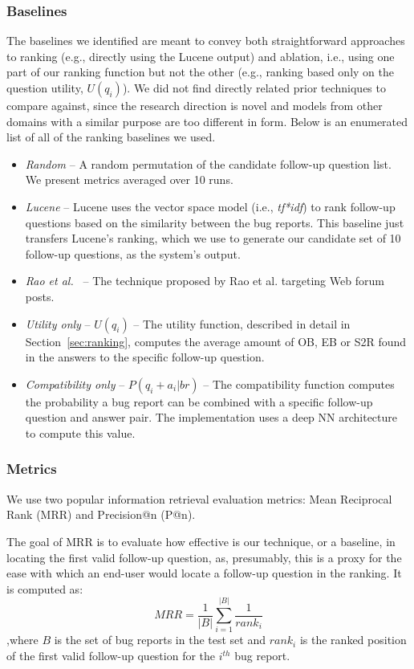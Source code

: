\subsubsection{Baselines}
The baselines we identified are meant to convey both straightforward approaches to ranking (e.g., directly using the Lucene output) and
ablation, i.e., using one part of our ranking function but not the other (e.g., ranking based only on the question utility, $U(q_{i})$).
We did not find directly related prior techniques to compare against, since the research direction is novel and models from other domains
with a similar purpose are too different in form. Below is an enumerated list of all of the ranking baselines we used.
\begin{itemize}
\item {\em Random} -- A random permutation of the candidate follow-up question list. We present metrics averaged over 10 runs.
\item {\em Lucene} -- Lucene uses the vector space model (i.e., {\em tf*idf}) to rank follow-up questions based on the similarity between the bug reports. This baseline just transfers Lucene's ranking, which we use to generate our candidate set of 10 follow-up questions, as the system's output.
\item {\em Rao et al.~\cite{rao-daume-iii-2018-learning}} -- The technique proposed by Rao et al. targeting Web forum posts.
\item {\em Utility only} -- $U(q_{i})$ -- The utility function, described in detail in Section~\ref{sec:ranking}, computes the average amount of OB, EB or S2R found in the answers to the specific follow-up question.
\item {\em Compatibility only} -- $P(q_{i}+a_{i}|br)$ -- The compatibility function computes the probability a bug report can be combined with a specific follow-up question and answer pair. The implementation uses a deep NN architecture to compute this value.
\end{itemize}

\subsubsection{Metrics}
We use two popular information retrieval evaluation metrics: Mean Reciprocal Rank (MRR) and Precision@n (P@n).

The goal of MRR is to evaluate how effective is our technique, or a baseline, in locating the first valid follow-up question, as, presumably, this is a proxy for the ease with which an end-user would locate a follow-up question in the ranking. It is
computed as: $$MRR = \frac{1}{|B|} \sum_{i=1}^{|B|} \frac{1}{rank_{i}}$$ ,where $B$ is the set of bug reports in the test set and $rank_{i}$ is the ranked position of the first valid follow-up question for the $i^{th}$ bug report.

